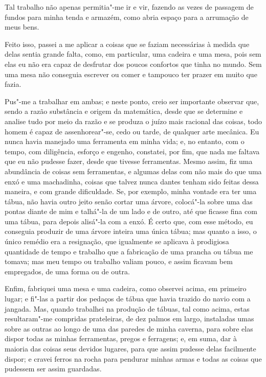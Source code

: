 Tal trabalho não apenas permitia"-me ir e vir, fazendo as vezes de
passagem de fundos para minha tenda e armazém, como abria espaço para a
arrumação de meus bens.

Feito isso, passei a me aplicar a coisas que se faziam necessárias à
medida que delas sentia grande falta, como, em particular, uma cadeira e
uma mesa, pois sem elas eu não era capaz de desfrutar dos poucos
confortos que tinha no mundo. Sem uma mesa não conseguia escrever ou
comer e tampouco ter prazer em muito que fazia.

Pus"-me a trabalhar em ambas; e neste ponto, creio ser importante
observar que, sendo a razão substância e origem da matemática, desde que
se determine e analise tudo por meio da razão e se produza o juízo mais
racional das coisas, todo homem é capaz de assenhorear"-se, cedo ou
tarde, de qualquer arte mecânica. Eu nunca havia manejado uma ferramenta
em minha vida; e, no entanto, com o tempo, com diligência, esforço e
engenho, constatei, por fim, que nada me faltava que eu não pudesse
fazer, desde que tivesse ferramentas. Mesmo assim, fiz uma abundância de
coisas sem ferramentas, e algumas delas com não mais do que uma enxó e
uma machadinha, coisas que talvez nunca dantes tenham sido feitas dessa
maneira, e com grande dificuldade. Se, por exemplo, minha vontade era
ter uma tábua, não havia outro jeito senão cortar uma árvore, colocá"-la
sobre uma das pontas diante de mim e talhá"-la de um lado e de outro, até
que ficasse fina com uma tábua, para depois alisá"-la com a enxó. É certo
que, com esse método, eu conseguia produzir de uma árvore inteira uma
única tábua; mas quanto a isso, o único remédio era a resignação, que
igualmente se aplicava à prodigiosa quantidade de tempo e trabalho que a
fabricação de uma prancha ou tábua me tomava; mas meu tempo ou trabalho
valiam pouco, e assim ficavam bem empregados, de uma forma ou de outra.

Enfim, fabriquei uma mesa e uma cadeira, como observei acima, em
primeiro lugar; e fi"-las a partir dos pedaços de tábua que havia trazido
do navio com a jangada. Mas, quando trabalhei na produção de tábuas, tal
como acima, estas resultaram"-me compridas prateleiras, de dez palmos em
largo, instaladas umas sobre as outras ao longo de uma das paredes de
minha caverna, para sobre elas dispor todas as minhas ferramentas,
pregos e ferragens; e, em suma, dar à maioria das coisas seus devidos
lugares, para que assim pudesse delas facilmente dispor; e cravei ferros
na rocha para pendurar minhas armas e todas as coisas que pudessem ser
assim guardadas.

